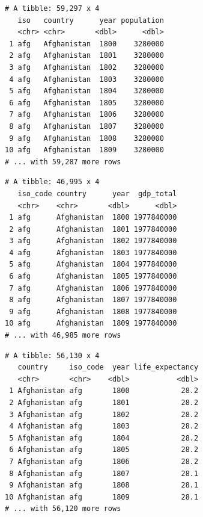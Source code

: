 \documentclass[
  11pt,
]{krantz}
\newenvironment{Shaded}{\begin{snugshade}}{\end{snugshade}}
\newcommand{\NormalTok}[1]{#1}
\newcommand{\OperatorTok}[1]{\textcolor[rgb]{0.43,0.43,0.43}{\textbf{#1}}}
\newcommand{\StringTok}[1]{\textcolor[rgb]{0.5,0.5,0.5}{#1}}
\begin{document}
\begin{Shaded}
\end{Shaded}

\begin{verbatim}
# A tibble: 59,297 x 4
   iso   country      year population
   <chr> <chr>       <dbl>      <dbl>
 1 afg   Afghanistan  1800    3280000
 2 afg   Afghanistan  1801    3280000
 3 afg   Afghanistan  1802    3280000
 4 afg   Afghanistan  1803    3280000
 5 afg   Afghanistan  1804    3280000
 6 afg   Afghanistan  1805    3280000
 7 afg   Afghanistan  1806    3280000
 8 afg   Afghanistan  1807    3280000
 9 afg   Afghanistan  1808    3280000
10 afg   Afghanistan  1809    3280000
# ... with 59,287 more rows
\end{verbatim}

\begin{Shaded}
\end{Shaded}

\begin{verbatim}
# A tibble: 46,995 x 4
   iso_code country      year  gdp_total
   <chr>    <chr>       <dbl>      <dbl>
 1 afg      Afghanistan  1800 1977840000
 2 afg      Afghanistan  1801 1977840000
 3 afg      Afghanistan  1802 1977840000
 4 afg      Afghanistan  1803 1977840000
 5 afg      Afghanistan  1804 1977840000
 6 afg      Afghanistan  1805 1977840000
 7 afg      Afghanistan  1806 1977840000
 8 afg      Afghanistan  1807 1977840000
 9 afg      Afghanistan  1808 1977840000
10 afg      Afghanistan  1809 1977840000
# ... with 46,985 more rows
\end{verbatim}

\begin{Shaded}
\end{Shaded}

\begin{verbatim}
# A tibble: 56,130 x 4
   country     iso_code  year life_expectancy
   <chr>       <chr>    <dbl>           <dbl>
 1 Afghanistan afg       1800            28.2
 2 Afghanistan afg       1801            28.2
 3 Afghanistan afg       1802            28.2
 4 Afghanistan afg       1803            28.2
 5 Afghanistan afg       1804            28.2
 6 Afghanistan afg       1805            28.2
 7 Afghanistan afg       1806            28.2
 8 Afghanistan afg       1807            28.1
 9 Afghanistan afg       1808            28.1
10 Afghanistan afg       1809            28.1
# ... with 56,120 more rows
\end{verbatim}
\end{document}
